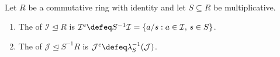\begin{definition} \label{def:localization-extension-contraction}
\\
Let $R$ be a commutative ring with identity and let $S\subseteq R$ be multiplicative.
\begin{enumerate}[label=(\roman*)]
\setlength{\itemsep}{0pt}
\item The  of $\mathcal{I}\trianglelefteq R$ is $\mathcal{I}^{\mathrm{e}}\defeq S^{-1}\mathcal{I}=\{a/s:a\in\mathcal{I},\,s\in S\}$.
\item The  of $\mathcal{J}\trianglelefteq S^{-1}R$ is $\mathcal{J}^{\mathrm{c}}\defeq\lambda_S^{-1}(\mathcal{J})$.
\end{enumerate}
\end{definition}


